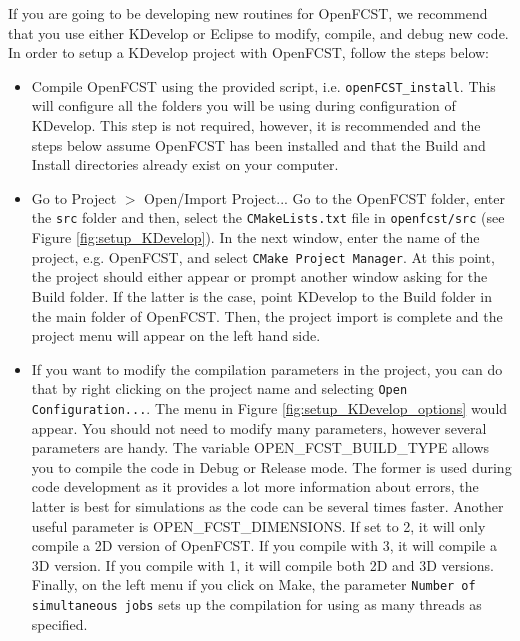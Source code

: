If you are going to be developing new routines for OpenFCST, we recommend that you use either KDevelop or Eclipse to modify, compile, and debug new code. In order to setup a KDevelop project with OpenFCST, follow the steps below:
\begin{itemize}
 \item Compile OpenFCST using the provided script, i.e. \texttt{openFCST\_install}. This will configure all the folders you will be using during configuration  of KDevelop. This step is not required, however, it is recommended and the steps below assume OpenFCST has been installed and that the Build and Install directories already exist on your computer.
 \item Go to Project $>$ Open/Import Project... Go to the OpenFCST folder, enter the \texttt{src} folder and then, select the \texttt{CMakeLists.txt} file in \texttt{openfcst/src} (see Figure \ref{fig:setup_KDevelop}). In the next window, enter the name of the project, e.g. OpenFCST, and select \texttt{CMake Project Manager}. At this point, the project should either appear or prompt another window asking for the Build folder. If the latter is the case, point KDevelop to the Build folder in the main folder of OpenFCST. Then, the project import is complete and the project menu will appear on the left hand side.
 \item If you want to modify the compilation parameters in the project, you can do that by right clicking on the project name and selecting \texttt{Open Configuration...}. The menu in Figure \ref{fig:setup_KDevelop_options} would appear. You should not need to modify many parameters, however several parameters are handy. The variable OPEN\_FCST\_BUILD\_TYPE allows you to compile the code in Debug or Release mode. The former is used during code development as it provides a lot more information about errors, the latter is best for simulations as the code can be several times faster. Another useful parameter is OPEN\_FCST\_DIMENSIONS. If set to 2, it will only compile a 2D version of OpenFCST. If you compile with 3, it will compile a 3D version. If you compile with 1, it will compile both 2D and 3D versions. Finally, on the left menu if you click on Make, the parameter \texttt{Number of simultaneous jobs} sets up the compilation for using as many threads as specified. 
\end{itemize}

